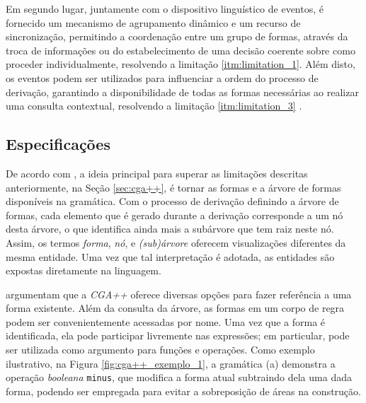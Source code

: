 Em segundo lugar, juntamente com o dispositivo linguístico de eventos, é fornecido um mecanismo de agrupamento dinâmico e um recurso de sincronização, permitindo a coordenação entre um grupo de formas, através da troca de informações ou do estabelecimento de uma decisão coerente sobre como proceder individualmente, resolvendo a limitação \ref{itm:limitation_1}. Além disto, os eventos podem ser utilizados para influenciar a ordem do processo de derivação, garantindo a disponibilidade de todas as formas necessárias ao realizar uma consulta contextual, resolvendo a limitação \ref{itm:limitation_3} \cite{schwarz2015}.

\subsection{Especificações}
\label{sec:especificacoes}

De acordo com , a ideia principal para superar as limitações descritas anteriormente, na Seção \ref{sec:cga++}, é tornar as formas e a árvore de formas disponíveis na gramática. Com o processo de derivação definindo a árvore de formas, cada elemento que é gerado durante a derivação corresponde a um nó desta árvore, o que identifica ainda mais a subárvore que tem raiz neste nó. Assim, os termos \textit{forma}, \textit{nó}, e \textit{(sub)árvore} oferecem visualizações diferentes da mesma entidade. Uma vez que tal interpretação é adotada, as entidades são expostas diretamente na linguagem.

\vspace{1cm}

 argumentam que a \textit{CGA++} oferece diversas opções para fazer referência a uma forma existente. Além da consulta da árvore, as formas em um corpo de regra podem ser convenientemente acessadas por nome. Uma vez que a forma é identificada, ela pode participar livremente nas expressões; em particular, pode ser utilizada como argumento para funções e operações. Como exemplo ilustrativo, na Figura \ref{fig:cga++_exemplo_1}, a gramática (a) demonstra a operação \textit{booleana} \texttt{minus}, que modifica a forma atual subtraindo dela uma dada forma, podendo ser empregada para evitar a sobreposição de áreas na construção.

